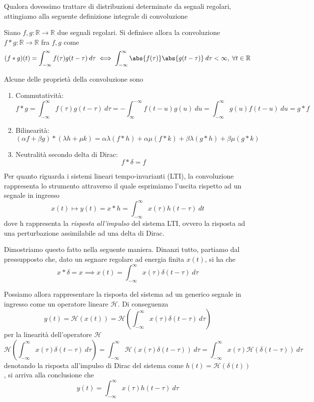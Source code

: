     Qualora dovessimo trattare di distribuzioni determinate da segnali regolari, attingiamo alla seguente definizione integrale di convoluzione

    Siano $f, g: \mathbb{R} \rightarrow \mathbb{R}$ due segnali regolari.
    Si definisce allora la convoluzione $f * g: \mathbb{R} \rightarrow \mathbb{R}$ fra $f, g$ come
    \[
        (f * g) (t) = \int_{-\infty}^{\infty} f(\tau)g(t - \tau) \: d\tau \iff \int_{-\infty}^{\infty} \abs{f(\tau)} \abs{g(t - \tau)} \: d\tau < \infty, \; \forall t \in \mathbb{R}
    \]

    Alcune delle proprietà della convoluzione sono
    \begin{enumerate}
        \item Commutatività:
        \[
            f * g = \int_{-\infty}^{\infty} f(\tau) g(t - \tau) \: d\tau = - \int_{\infty}^{-\infty} f(t - u) g(u) \: du = \int_{-\infty}^{\infty} g(u) f(t - u) \: du = g * f
        \]

        \item Bilinearità:
        \[
            (\alpha f + \beta g) * (\lambda h + \mu k) = \alpha \lambda (f * h) + \alpha \mu (f * k) + \beta \lambda (g * h) + \beta \mu (g * k)
        \]

        \item Neutralità secondo delta di Dirac:
        \[
            f * \delta  = f
        \]
    \end{enumerate}


    Per quanto riguarda i sistemi lineari tempo-invarianti (LTI), la convoluzione rappresenta lo strumento attraverso il quale esprimiamo l'uscita rispetto ad un segnale in ingresso
    \[
        x(t) \mapsto y(t) = x * h = \int_{-\infty}^{\infty} x(\tau) h(t - \tau) \: dt
    \]
    dove h rappresenta la \textit{risposta all'impulso} del sistema LTI, ovvero la risposta ad una perturbazione assimilabile ad una delta di Dirac.

    Dimostriamo questo fatto nella seguente maniera.
    Dinanzi tutto, partiamo dal pressupposto che, dato un segnare regolare ad energia finita $x(t)$, si ha che
    \[
        x * \delta = x \implies x(t) = \int_{-\infty}^{\infty} x(\tau) \delta(t - \tau) \: d\tau
    \]

    Possiamo allora rappresentare la risposta del sistema ad un generico segnale in ingresso come un operatore lineare $\mathcal{H}$.
    Di conseguenza
    \[
        y(t) = \mathcal{H}(x(t)) = \mathcal{H}\left(\int_{-\infty}^{\infty} x(\tau) \delta(t - \tau) \: d\tau\right)
    \]
    per la linearità dell'operatore $\mathcal{H}$
    \[
        \mathcal{H}\left(\int_{-\infty}^{\infty} x(\tau) \delta(t - \tau) \: d\tau\right) = \int_{-\infty}^{\infty} \mathcal{H}(x(\tau) \delta(t - \tau)) \: d\tau = \int_{-\infty}^{\infty} x(\tau) \mathcal{H}(\delta(t - \tau)) \: d\tau
    \]
    denotando la risposta all'impulso di Dirac del sistema come $h(t) = \mathcal{H}(\delta(t))$, si arriva alla conclusione che
    \[
        y(t) = \int_{-\infty}^{\infty} x(\tau) h(t - \tau) \: d\tau
    \]


